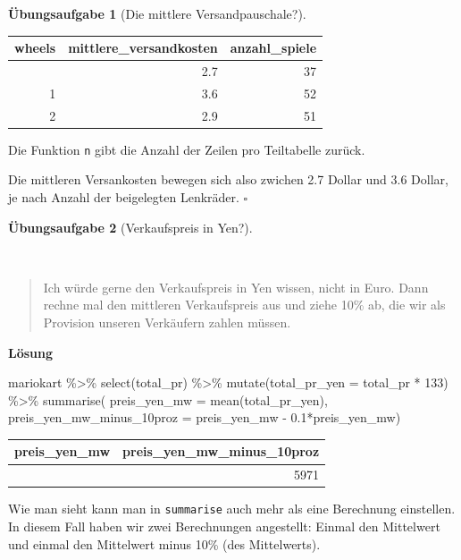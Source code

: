 \documentclass[
  letterpaper,
  oneside,
  open=any]{scrbook}
\newenvironment{Shaded}{\begin{snugshade}}{\end{snugshade}}
\newcommand{\AttributeTok}[1]{\textcolor[rgb]{0.40,0.45,0.13}{#1}}
\newcommand{\DecValTok}[1]{\textcolor[rgb]{0.68,0.00,0.00}{#1}}
\newcommand{\FloatTok}[1]{\textcolor[rgb]{0.68,0.00,0.00}{#1}}
\newcommand{\FunctionTok}[1]{\textcolor[rgb]{0.28,0.35,0.67}{#1}}
\newcommand{\NormalTok}[1]{\textcolor[rgb]{0.00,0.23,0.31}{#1}}
\newcommand{\SpecialCharTok}[1]{\textcolor[rgb]{0.37,0.37,0.37}{#1}}
\theoremstyle{definition}
\newtheorem{exercise}{Übungsaufgabe}[chapter]
\theoremstyle{definition}
\theoremstyle{definition}
\theoremstyle{remark}
\begin{document}
\begin{exercise}[Die mittlere
Versandpauschale?]
\begin{longtable}[]{@{}rrr@{}}
\toprule\noalign{}
wheels & mittlere\_versandkosten & anzahl\_spiele \\
\midrule\noalign{}
\endhead
\bottomrule\noalign{}
\endlastfoot
0 & 2.7 & 37 \\
1 & 3.6 & 52 \\
2 & 2.9 & 51 \\
\end{longtable}

Die Funktion \texttt{n} gibt die Anzahl der Zeilen pro Teiltabelle
zurück.

Die mittleren Versankosten bewegen sich also zwichen 2.7 Dollar und 3.6
Dollar, je nach Anzahl der beigelegten Lenkräder. \(\square\)

\end{exercise}

\begin{exercise}[Verkaufspreis in
Yen?]\protect\hypertarget{exr-Forschungsfrage3}{}\label{exr-Forschungsfrage3}

~

\begin{quote}
{} Ich würde gerne den Verkaufspreis in Yen wissen, nicht
in Euro. Dann rechne mal den mittleren Verkaufspreis aus und ziehe 10\%
ab, die wir als Provision unseren Verkäufern zahlen müssen.
\end{quote}

\textbf{Lösung}

\begin{Shaded}
\begin{Highlighting}[]
\NormalTok{mariokart }\SpecialCharTok{\%\textgreater{}\%} 
  \FunctionTok{select}\NormalTok{(total\_pr) }\SpecialCharTok{\%\textgreater{}\%} 
  \FunctionTok{mutate}\NormalTok{(}\AttributeTok{total\_pr\_yen =}\NormalTok{ total\_pr }\SpecialCharTok{*} \DecValTok{133}\NormalTok{) }\SpecialCharTok{\%\textgreater{}\%} 
  \FunctionTok{summarise}\NormalTok{(}
    \AttributeTok{preis\_yen\_mw =} \FunctionTok{mean}\NormalTok{(total\_pr\_yen),}
    \AttributeTok{preis\_yen\_mw\_minus\_10proz =}\NormalTok{ preis\_yen\_mw }\SpecialCharTok{{-}} \FloatTok{0.1}\SpecialCharTok{*}\NormalTok{preis\_yen\_mw)}
\end{Highlighting}
\end{Shaded}

\begin{longtable}[]{@{}rr@{}}
\toprule\noalign{}
preis\_yen\_mw & preis\_yen\_mw\_minus\_10proz \\
\midrule\noalign{}
\endhead
\bottomrule\noalign{}
\endlastfoot
6634 & 5971 \\
\end{longtable}

Wie man sieht kann man in \texttt{summarise} auch mehr als eine
Berechnung einstellen. In diesem Fall haben wir zwei Berechnungen
angestellt: Einmal den Mittelwert und einmal den Mittelwert minus 10\%
(des Mittelwerts).

\end{exercise}
\end{document}
